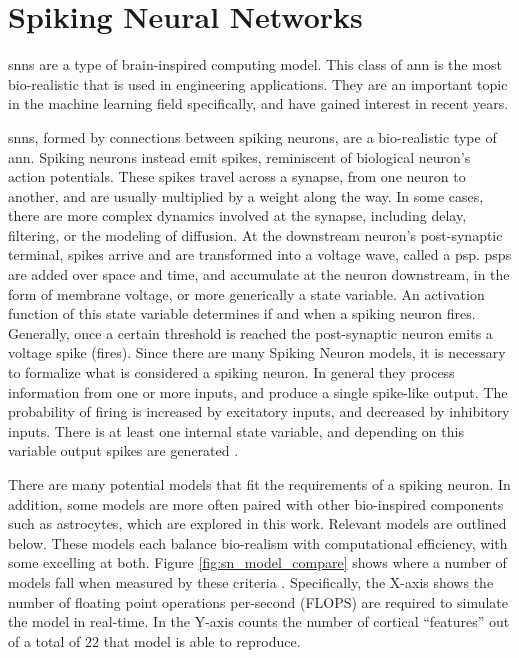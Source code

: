 \section{Spiking Neural Networks}
    \glspl{snn} are a type of brain-inspired computing model. This class of
    \gls{ann} is the most bio-realistic that is used in engineering
    applications. They are an important topic in the machine learning field
    specifically, and have gained interest in recent years.
    
    \glspl{snn}, formed by connections between spiking neurons, are a
    bio-realistic type of \gls{ann}. Spiking neurons instead emit spikes,
    reminiscent of biological neuron's action potentials. These spikes travel
    across a synapse, from one neuron to another, and are usually multiplied by
    a weight along the way. In some cases, there are more complex dynamics
    involved at the synapse, including delay, filtering, or the modeling of
    diffusion. At the downstream neuron's post-synaptic terminal, spikes arrive
    and are transformed into a voltage wave, called a \gls{psp}. \glspl{psp} are
    added over space and time, and accumulate at the neuron downstream, in the
    form of membrane voltage, or more generically a state variable. An
    activation function of this state variable determines if and when a spiking
    neuron fires. Generally, once a certain threshold is reached the
    post-synaptic neuron emits a voltage spike (fires). Since there are many
    Spiking Neuron models, it is necessary to formalize what is considered a
    spiking neuron. In general they process information from one or more inputs,
    and produce a single spike-like output. The probability of firing is
    increased by excitatory inputs, and decreased by inhibitory inputs. There is
    at least one internal state variable, and depending on this variable output
    spikes are generated \parencite{ponulak_2011}.

    There are many potential models that fit the requirements of a spiking
    neuron. In addition, some models are more often paired with other
    bio-inspired components such as astrocytes, which are explored in this
    work. Relevant models are outlined below. These models each balance
    bio-realism with computational efficiency, with some excelling at
    both. Figure \ref{fig:sn_model_compare} shows where a number of models fall
    when measured by these criteria \parencite{izhikevich_2004}. Specifically, the
    X-axis shows the number of floating point operations per-second (FLOPS) are
    required to simulate the model in real-time. In the Y-axis counts the number
    of cortical ``features'' out of a total of $22$ that model is able to
    reproduce.
    

